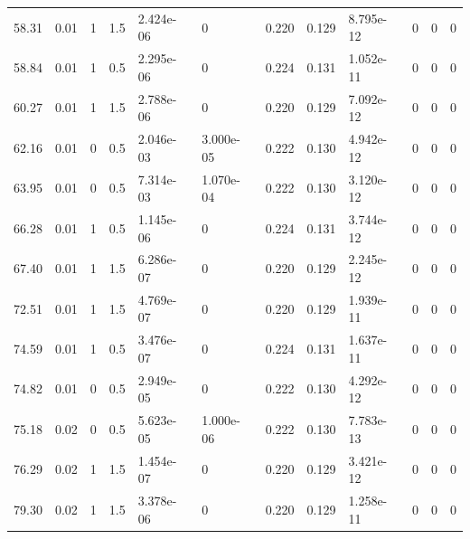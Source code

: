 \documentclass[preview]{standalone}
\begin{document}
{{\begin{tabular}{L{1.2cm}C{1.2cm} C{0.3cm}C{0.5cm} C{1.4cm}C{1.4cm} C{1.4cm}C{1.4cm} C{1.6cm}C{1.6cm} C{1.6cm}C{1.6cm}}
  58.31  &  0.01  & 1     & 1.5 &  2.424e-06  & 0  &  0.220&   0.129& 8.795e-12 & 0   &  0 & 0  \\ 
  58.84  &  0.01  & 1     & 0.5 &  2.295e-06  & 0  &  0.224&   0.131& 1.052e-11 & 0   &  0 & 0  \\ 
  60.27  &  0.01  & 1     & 1.5 &  2.788e-06  & 0  &  0.220&   0.129& 7.092e-12 & 0   &  0 & 0  \\ 
  62.16  &  0.01  & 0     & 0.5 &  2.046e-03  & 3.000e-05  &  0.222&   0.130& 4.942e-12 & 0   &  0 & 0  \\ 
  63.95  &  0.01  & 0     & 0.5 &  7.314e-03  & 1.070e-04  &  0.222&   0.130& 3.120e-12 & 0   &  0 & 0  \\ 
  66.28  &  0.01  & 1     & 0.5 &  1.145e-06  & 0  &  0.224&   0.131& 3.744e-12 & 0   &  0 & 0  \\ 
  67.40  &  0.01  & 1     & 1.5 &  6.286e-07  & 0  &  0.220&   0.129& 2.245e-12 & 0   &  0 & 0  \\ 
  72.51  &  0.01  & 1     & 1.5 &  4.769e-07  & 0  &  0.220&   0.129& 1.939e-11 & 0   &  0 & 0  \\ 
  74.59  &  0.01  & 1     & 0.5 &  3.476e-07  & 0  &  0.224&   0.131& 1.637e-11 & 0   &  0 & 0  \\ 
  74.82  &  0.01  & 0     & 0.5 &  2.949e-05  & 0  &  0.222&   0.130& 4.292e-12 & 0   &  0 & 0  \\ 
  75.18  &  0.02  & 0     & 0.5 &  5.623e-05  & 1.000e-06  &  0.222&   0.130& 7.783e-13 & 0   &  0 & 0  \\ 
  76.29  &  0.02  & 1     & 1.5 &  1.454e-07  & 0  &  0.220&   0.129& 3.421e-12 & 0   &  0 & 0  \\ 
  79.30  &  0.02  & 1     & 1.5 &  3.378e-06  & 0  &  0.220&   0.129& 1.258e-11 & 0   &  0 & 0  \\ 
\hline 
\end{tabular} 

}}
\end{document}

